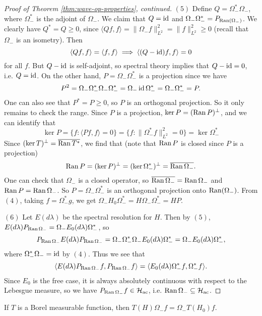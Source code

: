 \begin{proof}[Proof of Theorem \ref{thm:wave-op-properties}, continued]
  $(5)$ Define $Q = \Omega_-^* \Omega_-$, where
  $\Omega_-^*$ is the adjoint of $\Omega_-$.
  We claim that $Q = \operatorname{id}$ and
  $\Omega_- \Omega_-^* = P_{\operatorname{Ran}(\Omega_-)}$.
  We clearly have $Q^* = Q \ge 0$,
  since $\langle Qf, f \rangle = \|\Omega_- f\|_{L^2}^2 = \|f\|_{L^2}^2 \ge 0$ (recall that
  $\Omega_-$ is an isometry). Then
  \[
    \langle Qf, f \rangle = \langle f, f \rangle
    \implies \langle (Q - \operatorname{id}) f, f \rangle = 0
  \]
  for all $f$. But $Q - \operatorname{id}$ is self-adjoint, so
  spectral theory implies that
  $Q - \operatorname{id} = 0$, i.e. $Q = \operatorname{id}$.
  On the other hand, $P = \Omega_- \Omega_-^*$
  is a projection since we have
  \[
    P^2 = \Omega_- \Omega_-^* \Omega_- \Omega_-^*
    = \Omega_- \operatorname{id} \Omega_-^* = \Omega_- \Omega_-^* = P.
  \]
  One can also see that $P^* = P \ge 0$, so
  $P$ is an orthogonal projection. So it only
  remains to check the range. Since $P$ is a
  projection, $\ker P = (\operatorname{Ran} P)^\perp$, and we
  can identify that
  \[
    \ker P
    = \{f : \langle Pf, f \rangle = 0\}
    = \{f : \|\Omega_-^* f \|_{L^2}^2 = 0\}
    = \ker \Omega_-^*
  \]
  Since $(\ker T)^\perp = \overline{\operatorname{Ran} T^*}$,
  we find that (note that $\operatorname{Ran} P$ is closed since
  $P$ is a projection)
  \[
    \operatorname{Ran} P = (\ker P)^\perp
    = (\ker \Omega_-^*)^\perp
    = \overline{\operatorname{Ran} \Omega_-}.
  \]
  One can check that $\Omega_-$ is a closed
  operator, so $\overline{\operatorname{Ran} \Omega_-} = \operatorname{Ran} \Omega_-$
  and $\operatorname{Ran} P = \operatorname{Ran} \Omega_-$. So $P = \Omega_- \Omega_-^*$
  is an orthogonal projection onto
  $\operatorname{Ran}(\Omega_-)$. From $(4)$, taking
  $f = \Omega_-^* g$, we get
  $\Omega_- H_0 \Omega_-^* = H \Omega_- \Omega_-^* = H P$.

  $(6)$ Let $E(d\lambda)$ be the
  spectral resolution for $H$. Then by $(5)$,
  $E(d\lambda) P_{\operatorname{Ran} \Omega_-}
    = \Omega_- E_0(d\lambda) \Omega_-^*$, so
    \[
      P_{\operatorname{Ran} \Omega_-} E(d\lambda) P_{\operatorname{Ran} \Omega_-}
      = \Omega_- \Omega_-^* \Omega_- E_0(d\lambda) \Omega_-^*
      = \Omega_- E_0(d\lambda) \Omega_-^*,
    \]
  where $\Omega_-^* \Omega_- = \operatorname{id}$ by $(4)$.
  Thus we see that
  \[
    \langle E(d\lambda) P_{\operatorname{Ran} \Omega_-} f, P_{\operatorname{Ran} \Omega_-} f \rangle
    = \langle E_0(d\lambda) \Omega_-^* f, \Omega_-^* f \rangle.
  \]
  Since $E_0$ is the free case, it is
  always absolutely continuous with respect
  to the Lebesgue measure, so we have
  $P_{\operatorname{Ran} \Omega_-} f \in \mathcal{H}_{\mathrm{ac}}$, i.e.
  $\operatorname{Ran} \Omega_- \subseteq \mathcal{H}_{\mathrm{ac}}$.
\end{proof}

\begin{corollary}
  If $T$ is a Borel measurable function,
  then
  $T(H) \Omega_- f = \Omega_- T(H_0) f$.
\end{corollary}

